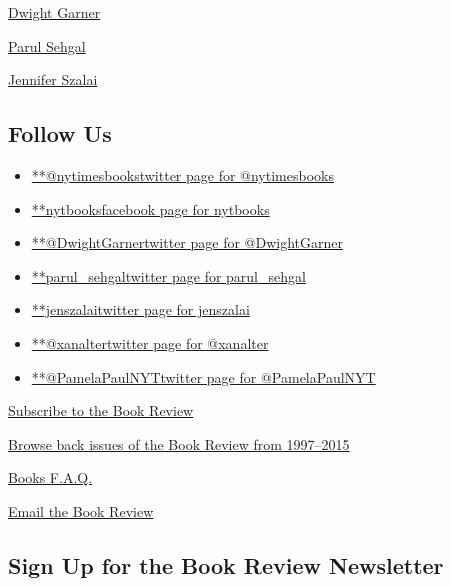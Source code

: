\href{https://www.nytimes3xbfgragh.onion/by/dwight-garner}{Dwight
Garner}

\href{https://www.nytimes3xbfgragh.onion/by/parul-sehgal}{Parul Sehgal}

\href{https://www.nytimes3xbfgragh.onion/by/jennifer-szalai}{Jennifer
Szalai}

\hypertarget{follow-us}{%
\subsection{Follow Us}\label{follow-us}}

\begin{itemize}
\tightlist
\item
  \href{https://twitter.com/nytimesbooks}{**@nytimesbookstwitter page
  for @nytimesbooks}
\item
  \href{https://www.facebookcorewwwi.onion/nytbooks}{**nytbooksfacebook
  page for nytbooks}
\item
  \href{https://twitter.com/DwightGarner}{**@DwightGarnertwitter page
  for @DwightGarner}
\item
  \href{https://twitter.com/parul_sehgal}{**parul\_sehgaltwitter page
  for parul\_sehgal}
\item
  \href{https://twitter.com/jenszalai}{**jenszalaitwitter page for
  jenszalai}
\item
  \href{https://twitter.com/xanalter}{**@xanaltertwitter page for
  @xanalter}
\item
  \href{https://twitter.com/PamelaPaulNYT}{**@PamelaPaulNYTtwitter page
  for @PamelaPaulNYT}
\end{itemize}

\href{https://homedelivery.nytimes3xbfgragh.onion/HDS/BookReviewHome.do?mode=BookReviewHome\&ref=review}{Subscribe
to the Book Review}

\href{https://www.nytimes3xbfgragh.onion/2014/07/29/books/review/the-new-york-times-book-review-back-issues.html}{Browse
back issues of the Book Review from 1997--2015}

\href{https://www.nytimes3xbfgragh.onion/membercenter/faq/books.html?ref=review}{Books
F.A.Q.}

\href{mailto:books@NYTimes.com}{Email the Book Review}

\hypertarget{sign-up-for-the-book-review-newsletter}{%
\subsection{Sign Up for the Book Review
Newsletter}\label{sign-up-for-the-book-review-newsletter}}

